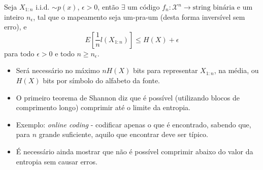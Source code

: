 \begin{frame}[allowframebreaks]
  \begin{theorem}
  Seja $X_{1:n}$ i.i.d. $\sim p(x)$, $\epsilon > 0$, então $\exists$ um código $f_n : \mathcal{X}^n \rightarrow \text{string binária}$
  e um inteiro $n_{\epsilon}$, tal que o mapeamento seja um-pra-um (desta forma inversível sem erro), e
        \begin{equation}
        E[ \frac{1}{n} l(X_{1:n})] \leq H(X) + \epsilon
        \end{equation}
  para todo $\epsilon > 0$ e todo $n \geq n_{\epsilon}$.
  \end{theorem}
  \begin{itemize}
  \item Será necessário no máximo $nH(X)$ bits para representar $X_{1:n}$, na média, ou $H(X)$ bits por símbolo do alfabeto da fonte.
  \item O primeiro teorema de Shannon diz que é possível (utilizando blocos de comprimento longo) comprimir até o limite da entropia.
  \item Exemplo: \textit{online coding} - codificar apenas o que é encontrado, sabendo que, para $n$ grande suficiente, aquilo que encontrar
        deve ser típico.
  \item É necessário ainda mostrar que não é possível comprimir abaixo do valor da entropia sem causar erros.
  \end{itemize}
\end{frame}

